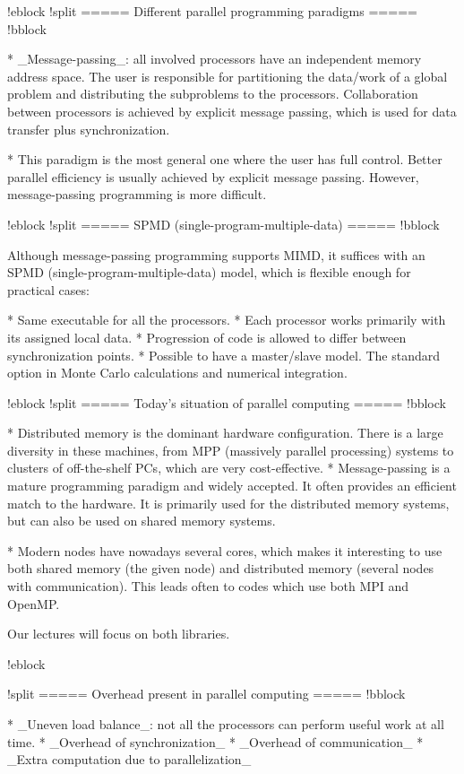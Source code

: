 \begin{itemize}
!eblock
!split
=====    Different parallel programming paradigms =====
!bblock

* _Message-passing_:  all involved processors have an independent memory address space. The user is responsible for 
partitioning the data/work of a global problem and distributing the  subproblems to the processors. Collaboration between processors is achieved by explicit message passing, which is used for data transfer plus synchronization.

* This paradigm is the most general one where the user has full control. Better parallel efficiency is usually achieved by explicit message passing. However, message-passing programming is more difficult.


!eblock
!split
===== SPMD (single-program-multiple-data) =====
!bblock

Although message-passing programming supports MIMD, it 
suffices with an SPMD (single-program-multiple-data) model, which
is flexible enough for practical cases:

* Same executable for all the processors.
* Each processor works primarily with its assigned local data.
* Progression of code is allowed to differ between synchronization points.
* Possible to have a master/slave model. The standard option in Monte Carlo calculations and numerical integration.

!eblock
!split
=====    Today's situation of parallel computing  =====
!bblock

* Distributed memory is the dominant hardware configuration. There is a large diversity in these machines, from 
MPP (massively parallel processing) systems to clusters of off-the-shelf PCs, which are very cost-effective.
* Message-passing is a mature programming paradigm and widely accepted. It often provides an efficient match to the hardware.
It is primarily used for the distributed memory systems, but can also be used on shared memory systems.

* Modern nodes have nowadays several cores, which makes it interesting to use both shared memory (the given node) and distributed memory (several nodes with communication). This leads often to codes which use both MPI and OpenMP.

Our lectures will focus on both libraries.

!eblock

!split
=====  Overhead present in parallel computing =====
!bblock

* _Uneven load balance_:  not all the processors can perform useful
work at all time.
* _Overhead of synchronization_
* _Overhead of communication_
* _Extra computation due to parallelization_


\end{itemize}
